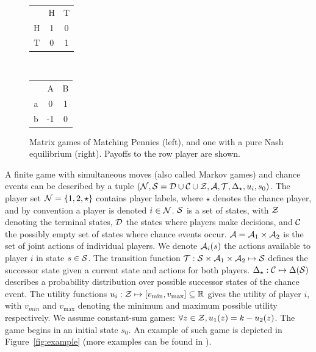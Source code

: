 

\begin{figure}[t!]
\centering
\begin{tabular}{c|c|c|}
 \multicolumn{1}{c}{~} & \multicolumn{1}{c}{H}  &  \multicolumn{1}{c}{T}\\\cline{2-3}
H &  1  &  0\\\cline{2-3}
T  & 0  &  1\\\cline{2-3}
\end{tabular}
~~~~~~~~~
\begin{tabular}{c|c|c|}
 \multicolumn{1}{c}{~} & \multicolumn{1}{c}{A}  &  \multicolumn{1}{c}{B}\\\cline{2-3}
a &  0  &  1\\\cline{2-3}
b & -1  &  0\\\cline{2-3}
\end{tabular}
\caption{Matrix games of Matching Pennies (left), and one with a pure Nash equilibrium (right). 
Payoffs to the row player are shown. \label{fig:egMatrixGames}}
\end{figure}

A finite game with simultaneous moves (also called Markov games) and chance events can be described
by a tuple $(\mathcal{N}, \mathcal{S} = \mathcal{D}\cup\mathcal{C}\cup\mathcal{Z}, \mathcal{A}, \mathcal{T}, \Delta_\star, u_i, s_0)$.
The player set $\mathcal{N} = \{ 1, 2, \star \}$ contains player labels, where 
$\star$ denotes the chance player, and by convention a player is denoted $i \in \mathcal{N}$.
$\mathcal{S}$ is a set of states, with $\mathcal{Z}$ denoting the terminal states, $\mathcal{D}$ the states where players make decisions, 
and $\mathcal{C}$ the possibly empty set of states where chance events occur. $\mathcal{A} = \mathcal{A}_1 \times \mathcal{A}_2$ is the set of 
joint actions of individual players. We denote $\mathcal{A}_i(s)$ the actions available to player $i$ in state $s \in \mathcal{S}$. 
The transition function $\mathcal{T} : \mathcal{S} \times \mathcal{A}_1 \times \mathcal{A}_2 \mapsto \mathcal{S}$ defines the successor state given a current 
state and actions for both players. $\Delta_\star:\mathcal{C} \mapsto \Delta(\mathcal{S})$ describes a probability distribution over 
possible successor states of the chance event. 
The utility functions $u_i : \mathcal{Z} \mapsto [v_{\min}, v_{\max}] \subseteq \mathbb{R}$ gives the utility of player $i$, with 
$v_{min}$ and $v_{\max}$ denoting the minimum and maximum possible utility respectively. We assume constant-sum 
games: $\forall z \in \mathcal{Z}, u_1(z) = k - u_2(z)$. 
The game begins in an initial state $s_0$. 
An example of such game is depicted in Figure~\ref{fig:example} (more examples can be found in \cite[Chapter 5]{Saffidine2013thesis}).

